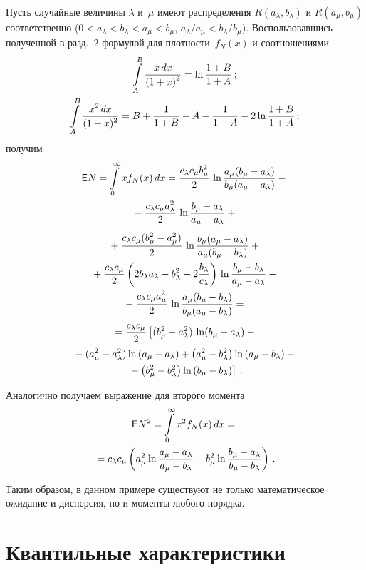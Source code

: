 \begin{multicols}{2}
Пусть случайные величины $\lambda$ и~$\mu$ имеют распределения $R(a_\lambda,b_\lambda)$ и $R(a_\mu,b_\mu)$
соответственно ($0<a_\lambda<b_\lambda<a_\mu<b_\mu$, $a_\lambda/a_\mu<b_\lambda/b_\mu$). Воспользовавшись полученной
в разд.~2 формулой для плотности~$f_N(x)$ и соотношениями
\begin{gather*}
\il{A}{B}\fr{x\,dx}{(1+x)^2}=\ln\fr{1+B}{1+A}\,;\\
\il{A}{B}\fr{x^2\,dx}{(1+x)^2}=B+\fr{1}{1+B}-A-\fr{1}{1+A}-2\ln\fr{1+B}{1+A}\,;
\end{gather*}
получим
\begin{multline*}
\e N=\il{0}{\infty}xf_N(x)\,dx=\fr{c_\lambda c_\mu b_\mu^2}{2}\,\ln\fr{a_\mu(b_\mu-
a_\lambda)}{b_\mu(a_\mu-a_\lambda)}-{}\\
{}-\fr{c_\lambda c_\mu a_\lambda^2}{2}\,\ln
\fr{b_\mu- a_\lambda}{a_\mu-a_\lambda}+{}
\end{multline*}
\begin{multline*}
{}+\fr{c_\lambda c_\mu (b_\mu^2-a_\mu^2)}{2}\,\ln
\fr{b_\mu(a_\mu-a_\lambda)}{a_\mu(b_\mu-b_\lambda)}+{}\\
{}+\fr{c_\lambda c_\mu }{2}
\left(2b_\lambda a_\lambda-b_\lambda^2+2\fr{b_\lambda}{c_\lambda}\right)\,\ln
\fr{b_\mu-b_\lambda}{a_\mu-a_\lambda}-{}\\
{}-\fr{c_\lambda c_\mu a_\mu^2}{2}\,\ln
\fr{a_\mu(b_\mu-b_\lambda)}{b_\mu(a_\mu-b_\lambda)}={}\\
{}=\fr{c_\lambda c_\mu}{2}\left[(b_\mu^2-a_\lambda^2)\,\ln(b_\mu-a_\lambda)-{}\right.\\
{}-
(a_\mu^2-a_\lambda^2)\ln\left(a_\mu-a_\lambda\right)+\left(a_\mu^2-b_\lambda^2\right)\ln
\left(a_\mu-b_\lambda\right)-{}\\
\left.{}-\left(b_\mu^2-b_\lambda^2\right)\ln\left(b_\mu-b_\lambda\right)\right]\,.
\end{multline*}

Аналогично получаем выражение для второго момента
\begin{multline*}
\e N^2=\il{0}{\infty}x^2f_N(x)\,dx={}\\
{}=c_\lambda c_\mu\left(a_\mu^2\ln\fr{a_\mu-a_\lambda}
{a_\mu-b_\lambda}-b_\mu^2\ln\fr{b_\mu-a_\lambda}{b_\mu-b_\lambda}\right)\,.
\end{multline*}

Таким образом, в данном примере существуют не только математическое ожидание и дисперсия, но и моменты любого
порядка.

\section{Квантильные характеристики}


\end{multicols}
